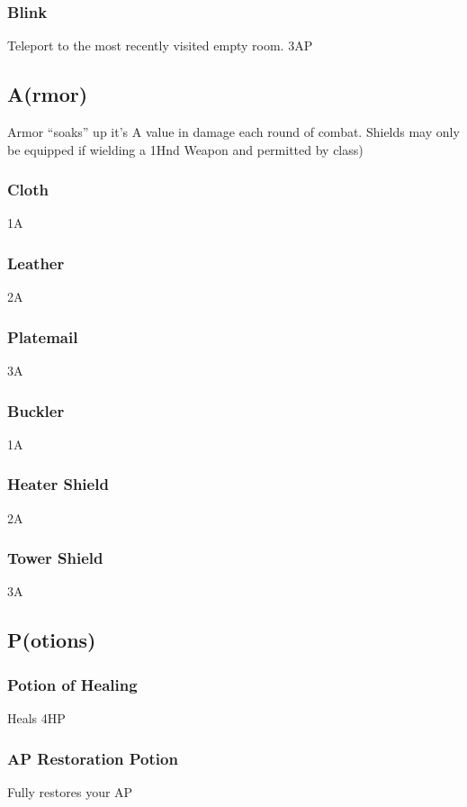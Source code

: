 \documentclass[a6paper,hidelinks]{article}
\begin{document}
\subsubsection{Blink}
Teleport to the most recently visited empty room. 3AP

\subsection{A(rmor)}

Armor ``soaks'' up it’s A value in damage each round of combat. Shields may only be equipped if wielding a 1Hnd Weapon and permitted by class)

\subsubsection{Cloth}
1A

\subsubsection{Leather}
2A

\subsubsection{Platemail}
3A

\subsubsection{Buckler}
1A

\subsubsection{Heater Shield}
2A

\subsubsection{Tower Shield}
3A

\subsection{P(otions)}

\subsubsection{Potion of Healing}
Heals 4HP

\subsubsection{AP Restoration Potion}
Fully restores your AP
\end{document}
